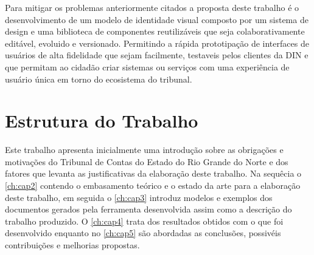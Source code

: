   Para mitigar os problemas anteriormente citados a proposta deste trabalho é o desenvolvimento de um modelo de identidade visual composto por um sistema de design e uma biblioteca de componentes reutilizáveis que seja colaborativamente editável, evoluido e versionado. Permitindo a rápida prototipação de interfaces de usuários de alta fidelidade que sejam facilmente, testaveis pelos clientes da DIN e que permitam ao cidadão criar sistemas ou serviços com uma experiência de usuário única em torno do ecosistema do tribunal.



  \section{Estrutura do Trabalho}
  Este trabalho apresenta inicialmente uma introdução sobre as obrigações e motivações do Tribunal de Contas do Estado do Rio Grande do Norte e dos fatores que levanta as justificativas da elaboração deste trabalho.
  Na sequêcia o \autoref{ch:cap2} contendo o embasamento teórico e o estado da arte para a elaboração deste trabalho, em seguida o \autoref{ch:cap3} introduz modelos e exemplos dos documentos gerados pela ferramenta desenvolvida assim como a descrição do trabalho produzido. O \autoref{ch:cap4} trata dos resultados obtidos com o que foi desenvolvido enquanto no \autoref{ch:cap5} são abordadas as conclusões, possivéis contribuições e melhorias propostas.
